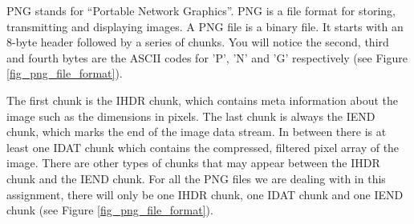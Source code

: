 \begin{figure}[h]  
\centering
{}
\end{figure}

PNG stands for ``Portable Network Graphics''. PNG is a file format for storing, transmitting and displaying images\cite{Roelofs1999PNG}. A PNG file is a binary file. It starts with an 8-byte header followed by a series of chunks. You will notice the second, third and fourth bytes are the ASCII codes for 'P', 'N' and 'G' respectively (see Figure \ref{fig_png_file_format}).

The first chunk is the IHDR chunk, which contains meta information about the image such as the dimensions in pixels. The last chunk is always the IEND chunk, which marks the end of the image data stream. In between there is at least one IDAT chunk which contains the compressed, filtered pixel array of the image. There are other types of chunks that may appear between the IHDR chunk and the IEND chunk. For all the PNG files we are dealing with in this assignment, there will only be one IHDR chunk, one IDAT chunk and one IEND chunk (see Figure \ref{fig_png_file_format}).


